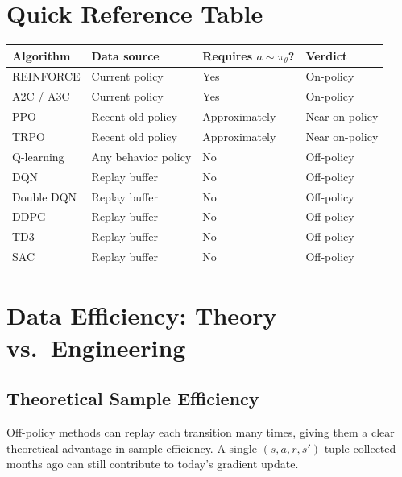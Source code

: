 \section{Quick Reference Table}
\label{sec:reference-table}

\begin{center}
\begin{tabular}{@{} l l l l @{}}
\toprule
\textbf{Algorithm} & \textbf{Data source} & \textbf{Requires $a \sim \pi_\theta$?} & \textbf{Verdict} \\
\midrule
REINFORCE   & Current policy       & Yes          & On-policy \\
A2C / A3C   & Current policy       & Yes          & On-policy \\
PPO         & Recent old policy    & Approximately & Near on-policy \\
TRPO        & Recent old policy    & Approximately & Near on-policy \\
Q-learning  & Any behavior policy  & No           & Off-policy \\
DQN         & Replay buffer        & No           & Off-policy \\
Double DQN  & Replay buffer        & No           & Off-policy \\
DDPG        & Replay buffer        & No           & Off-policy \\
TD3         & Replay buffer        & No           & Off-policy \\
SAC         & Replay buffer        & No           & Off-policy \\
\bottomrule
\end{tabular}
\end{center}

\section{Data Efficiency: Theory vs.\ Engineering}
\label{sec:data-efficiency}

\subsection{Theoretical Sample Efficiency}

Off-policy methods can replay each transition many times, giving them a clear theoretical advantage in sample efficiency. A single $(s, a, r, s')$ tuple collected months ago can still contribute to today's gradient update.

